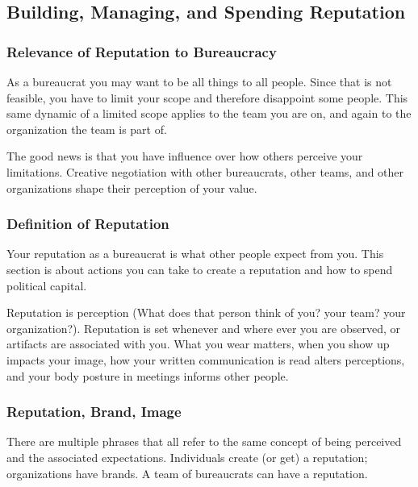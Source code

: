 \subsection{Building, Managing, and Spending Reputation\label{sec:reputation}}


\subsubsection{Relevance of Reputation to Bureaucracy}

As a bureaucrat you may want to be all things to all people. Since that is not feasible, you have to limit your scope and therefore disappoint some people. This same dynamic of a limited scope applies to the team you are on, and again to the organization the team is part of.

The good news is that you have influence over how others perceive your limitations. Creative negotiation with other bureaucrats, other teams, and other organizations shape their perception of your value. 

\subsubsection{Definition of Reputation}

Your reputation as a bureaucrat is what other people expect from you. This section is about actions you can take to create a reputation and how to spend political capital. 



Reputation is perception (What does that person think of you? your team? your organization?). Reputation is set whenever and where ever you are observed, or artifacts are associated with you. What you wear matters, when you show up impacts your image, how your written communication is read alters perceptions, and your body posture in meetings informs other people. 



\subsubsection{Reputation, Brand, Image}

There are multiple phrases that all refer to the same concept of being perceived and the associated expectations. Individuals create (or get) a reputation; organizations have brands. A team of bureaucrats can have a reputation. 

